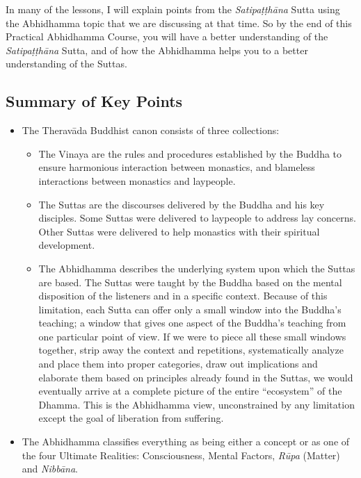 In many of the lessons, I will explain points from the \textit{Satipaṭṭhāna} Sutta using the Abhidhamma topic that we are discussing at that time. So by the end of this Practical Abhidhamma Course, you will have a better understanding of the \textit{Satipaṭṭhāna} Sutta, and of how the Abhidhamma helps you to a better understanding of the Suttas.

\pagebreak

\subsection*{Summary of Key Points}

\begin{itemize}

\item The Theravāda Buddhist canon consists of three collections:

\begin{itemize}

\item The Vinaya are the rules and procedures established by the Buddha to ensure harmonious interaction between monastics, and blameless interactions between monastics and laypeople.

\item The Suttas are the discourses delivered by the Buddha and his key disciples. Some Suttas were delivered to laypeople to address lay concerns. Other Suttas were delivered to help monastics with their spiritual development.

\item The Abhidhamma describes the underlying system upon which the Suttas are based. The Suttas were taught by the Buddha based on the mental disposition of the listeners and in a specific context. Because of this limitation, each Sutta can offer only a small window into the Buddha’s teaching; a window that gives one aspect of the Buddha’s teaching from one particular point of view. If we were to piece all these small windows together, strip away the context and repetitions, systematically analyze and place them into proper categories, draw out implications and elaborate them based on principles already found in the Suttas, we would eventually arrive at a complete picture of the entire “ecosystem” of the Dhamma. This is the Abhidhamma view, unconstrained by any limitation except the goal of liberation from suffering.

\end{itemize}

\item The Abhidhamma classifies everything as being either a concept or as one of the four Ultimate Realities: Consciousness, Mental Factors, \textit{Rūpa} (Matter) and \textit{Nibbāna}.


\end{itemize}
